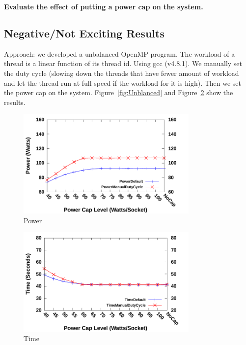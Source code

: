 

\textbf{Evaluate the effect of putting a power cap on the system.}    


\subsection{Negative/Not Exciting Results}
Approach: we developed a unbalanced OpenMP program. The workload of a thread 
is a linear function of its thread id. 
Using gcc (v4.8.1).
We manually set the duty cycle (slowing down the threads that have fewer amount
of workload and let the thread run at full speed if the workload for it is high). 
Then we set the power cap on the system. 
Figure~\ref{fig:Unblanced} and Figure~\ref{fig:UnbalancedTime} show the results.

\begin{figure}[bt]
    \includegraphics[width=3.5in]{orig-dutycyle-compare-power.pdf}
    \caption{Power }
    \label{fig:Unbalanced}
\end{figure}
\begin{figure}[bt]
    \includegraphics[width=3.5in]{orig-dutycyle-compare-time.pdf}
    \caption{Time}
    \label{fig:UnbalancedTime}
\end{figure}

